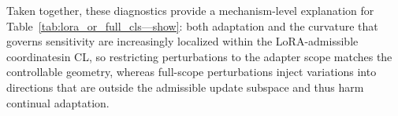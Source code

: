 \documentclass{article}
\theoremstyle{plain}
\theoremstyle{definition}
\theoremstyle{remark}
\begin{document}
Taken together, these diagnostics provide a mechanism-level explanation for Table~\ref{tab:lora_or_full_cls—show}: both adaptation and the curvature that governs sensitivity are increasingly localized within the LoRA-admissible coordinatesin CL, so restricting perturbations to the adapter scope matches the controllable geometry, whereas full-scope perturbations inject variations into directions that are outside the admissible update subspace and thus harm continual adaptation.




\end{document}
